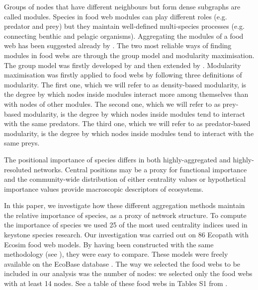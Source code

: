 	Groups of nodes that have different neighbours but form dense subgraphs are called modules. Species in food web modules can play different roles (e.g. predator and prey) but they maintain well-defined multi-species processes (e.g. connecting benthic and pelagic organisms). Aggregating the modules of a food web has been suggested already by \citet{Allesina2009a}. The two most reliable ways of finding modules in food webs are through the group model and modularity maximisation. The group model was firstly developed by \citet{Allesina2009a} and then extended by \citet{Sander2015}.	Modularity maximisation was firstly applied to food webs by \citet{Guimera2010} following three definitions of modularity.	The first one, which we will refer to as density-based modularity, is the degree by which nodes inside modules interact more among themselves than with nodes of other modules.	The second one, which we will refer to as prey-based modularity, is the degree by which nodes inside modules tend to interact with the same predators.	The third one, which we will refer to as predator-based modularity, is the degree by which nodes inside modules tend to interact with the same preys.

	The positional importance of species differs in both highly-aggregated and highly-resoluted networks. Central positions may be a proxy for functional importance and the community-wide distribution of either centrality values \citep{Bauer2010} or hypothetical importance values \citep{Mills1993} provide macroscopic descriptors of ecosystems.

	In this paper, we investigate how these different aggregation methods maintain the relative importance of species, as a proxy of network structure.
	To compute the importance of species we used 25 of the most used centrality indices used in keystone species research.
	Our investigation was carried out on 86 Ecopath with Ecosim food web models. By having been constructed with the same methodology (see \citet{Okey2004}), they were easy to compare. These models were freely available on the EcoBase database \citep{Colleter2013}. The way we selected the food webs to be included in our analysis was the number of nodes: we selected only the food webs with at least 14 nodes.  See a table of these food webs in Tables S1 from \citet{Heymans2014}. %
